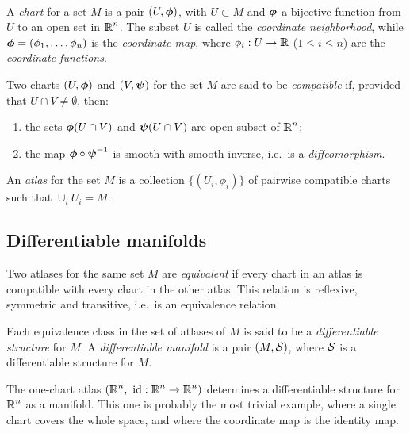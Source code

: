 \documentclass{31x47jw}
\begin{document}
\paragraph{}\index{}

A \emph{chart} for a set $M$ is a pair $(U,{\mbox{\boldmath $\phi$}})$, with $U\subset
M$ and ${\mbox{\boldmath $\phi$}}$ a bijective function from $U$ to an open set in
$\mathbb{I\!\!R}^{n}$.  The subset $U$ is called the \emph{coordinate
neighborhood}, while ${\mbox{\boldmath $\phi$}} = (\phi_{1},\ldots,\phi_{n})$ is the
\emph{coordinate map}, where $\phi_{i}: U\rightarrow \mathbb{I\!\!R}$ ($1\leq i\leq
n$) are the \emph{coordinate functions}.

Two charts $(U,{\mbox{\boldmath $\phi$}})$ and $(V,{\mbox{\boldmath $\psi$}})$ for the set $M$ are said to be
\emph{compatible} if, provided that $U \cap V \not= \emptyset$, then:

\begin{enumerate}
    \item the sets ${\mbox{\boldmath $\phi$}}(U \cap V)$ and ${\mbox{\boldmath $\psi$}}(U \cap V)$ are open
    subset of $\mathbb{I\!\!R}^{n}$; 
    
    \item the map ${\mbox{\boldmath $\phi$}}\circ{\mbox{\boldmath $\psi$}}^{-1}$ is smooth with smooth inverse,
    i.e.~is a \emph{diffeomorphism}.
\end{enumerate}

An \emph{atlas} for the set $M$ is a collection $\{
(U_{i},\phi_{i}) \}$ of pairwise compatible charts such that
$\cup_{i} U_{i} = M$.


\subsection{Differentiable manifolds}

Two atlases for the same set $M$ are \emph{equivalent} if every chart
in an atlas is compatible with every chart in the other atlas.  This
relation is reflexive, symmetric and transitive, i.e.~is an
equivalence relation.

Each equivalence class in the set of atlases of $M$ is said to be a 
\emph{differentiable structure} for $M$.
A \emph{differentiable manifold} is a pair $(M,{\cal S})$, 
where ${\cal S}$ is a differentiable structure for $M$.

The one-chart atlas $(\R^{n},\ \mbox{id}:\R^{n} \rightarrow\R^{n})$ 
determines a differentiable structure for $\mathbb{I\!\!R}^{n}$ as a manifold. 
This one is probably the most trivial example, where a single chart 
covers the whole space, and where the coordinate map is the identity 
map.
\end{document}
